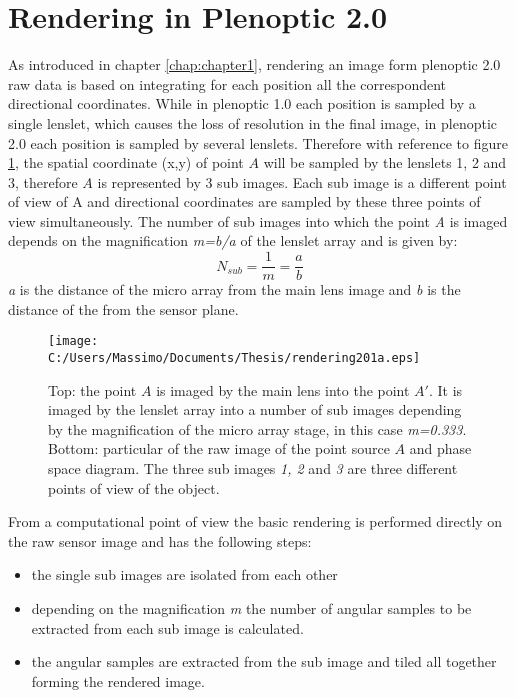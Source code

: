 \section{Rendering in Plenoptic 2.0}
\label{sec:rendering}
As introduced in chapter \ref{chap:chapter1}, rendering an image form plenoptic 2.0  raw data is based on integrating for each position all the correspondent directional coordinates. While in plenoptic 1.0 each position is sampled by a single lenslet, which causes the loss of resolution in the final image, in plenoptic 2.0 each position is sampled by several lenslets. Therefore with reference to figure \ref{fig:render202}, the spatial coordinate (x,y) of point $A$ will be sampled by the lenslets 1, 2 and 3, therefore $A$ is represented by 3 sub images. Each sub image is a different point of view of A and directional coordinates are sampled by these three points of view simultaneously. The number of sub images into which the point \textit{A} is imaged depends on the magnification \textit{m=b/a} of the lenslet array and is given by:
\begin{equation}
\label{eq:point_of_view}
N_{sub} = \dfrac{1}{m}=\dfrac{a}{b}
\end{equation}
 \textit{a} is the distance of the micro array from the main lens image and \textit{b} is the distance of the from the sensor plane. 
\begin{figure}[H]
	\centering
	\texttt{[image: C:/Users/Massimo/Documents/Thesis/rendering201a.eps]}
	\caption{\label{fig:render202} Top: the point $A$ is imaged by the main lens into the point $A'$. It is imaged by the lenslet array into a number of sub images depending by the magnification of the micro array stage, in this case \textit{m=0.333}. Bottom: particular of the raw image of the point source $A$ and phase space diagram. The three sub images \textit{1, 2} and \textit{3} are three different points of view of the object.  }
\end{figure}
From a computational point of view the basic rendering is performed directly on the raw sensor image and has the following steps:
\begin{itemize}
	\item the single sub images are isolated from each other 
	\item depending on the magnification \textit{m} the number of angular samples to be extracted from each sub image is calculated.
	\item the angular samples are extracted from the sub image and tiled all together forming the rendered image.
\end{itemize}
